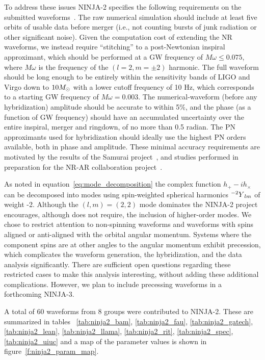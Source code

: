 To address these issues NINJA-2 specifies the following requirements
on the submitted waveforms~\cite{ninja2-wiki}.  The raw numerical
simulation should include at least five orbits of usable data before
merger (i.e., not counting bursts of junk radiation or other
significant noise).  Given the computation cost of extending the NR
waveforms, we instead require ``stitching'' to a post-Newtonian
inspiral approximant, which should be performed at a GW frequency of
$M\omega \leq 0.075$, where $M\omega$ is the frequency of the $(l = 2,
m = \pm 2)$ harmonic. The full waveform should be long enough to be
entirely within the sensitivity bands of LIGO and Virgo down to $10
M_\odot$ with a lower cutoff frequency of 10 Hz, which corresponds to a
starting GW frequency of $M\omega = 0.003$.  The numerical-waveform
(before any hybridization) amplitude should be accurate to within 5\%,
and the phase (as a function of GW frequency) should have an
accumulated uncertainty over the entire inspiral, merger and ringdown,
of no more than 0.5 radian.  The PN approximants used for
hybridization should ideally use the highest PN orders available, both
in phase and amplitude.  These minimal accuracy requirements are
motivated by the results of the Samurai project~\cite{Hannam:2009hh},
and studies performed in preparation for the NR-AR collaboration
project~\cite{ninja-wiki}.

As noted in equation~\ref{eq:mode_decomposition} the complex function
$h_+-ih_\times$ can be decomposed into modes using spin-weighted
spherical harmonics ${{}^{-2}Y}_{lm}$ of weight -2.  Although the
$(l,m)=(2,2)$ mode dominates the NINJA-2 project encourages, although
does not require, the inclusion of higher-order modes.  We chose to
restrict attention to non-spinning waveforms and waveforms with spins
aligned or anti-aligned with the orbital angular momentum.  Systems
where the component spins are at other angles to the angular momentum
exhibit precession, which complicates the waveform generation, the
hybridization, and the data analysis significantly.  There are
sufficient open questions regarding these restricted cases to make
this analysis interesting, without adding these additional
complications.  However, we plan to include precessing waveforms in
a forthcoming NINJA-3.

A total of 60 waveforms from 8 groups were contributed to NINJA-2.
These are summarized in tables ~\ref{tab:ninja2_bam},
\ref{tab:ninja2_fau}, \ref{tab:ninja2_gatech}, \ref{tab:ninja2_lean},
\ref{tab:ninja2_llama}, \ref{tab:ninja2_rit}, \ref{tab:ninja2_spec},
\ref{tab:ninja2_uiuc} and a map of the parameter values is shown in
figure~\ref{f:ninja2_param_map}.

